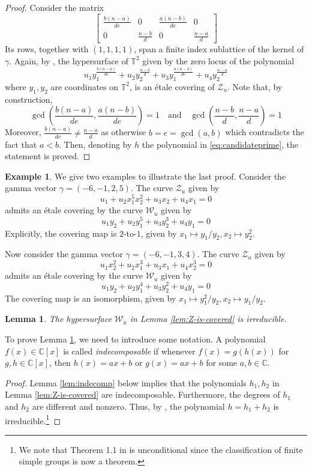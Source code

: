 \documentclass[11pt, reqno]{amsart}
\theoremstyle{plain}
\newtheorem{lem}[thm]{Lemma}
\theoremstyle{definition}
\newtheorem{example}[thm]{Example}
\newcommand{\CC}{\mathbb{C}}
\newcommand{\TT}{\mathbb{T}}
\newcommand{\ga}{\gamma}
\begin{document}
\begin{proof}
Consider the matrix 
\[
\begin{bmatrix}
    \frac{b(n-a)}{de} & 0 &\frac{a(n-b)}{de} &0 \\
    0 & \frac{n-b}{d}& 0 & \frac{n-a}{d}
\end{bmatrix}
\]
Its rows, together with $(1,1,1,1)$, span a finite index sublattice of the kernel of $\gamma$. Again, by \cite[Proposition 3.6]{asem-hgms-toric}, 
the hypersurface of $\TT^2$ given by the zero locus of the polynomial
\begin{equation}
\label{eq:candidateprime}
u_1  y_1^{\frac{b(n-a)}{de}}+ u_2 y_2^{\frac{n-b}{d}}  +u_3 y_1^{\frac{a(n-b)}{de}} +u_4 y_2^{\frac{n-a}{d}}
\end{equation}
where $y_1, y_2$ are coordinates on $\TT^2$,
is an étale covering of $\mathcal{Z}_{u}$. Note that, by construction,  
\[\gcd\left(\frac{b(n-a)}{de}, \frac{a(n-b)}{de}\right)=1 \quad \text{and} \quad  \gcd\left(\frac{n-b}{d}, \frac{n-a}{d}\right)=1\]
Moreover, $\frac{b(n-a)}{de} \neq \frac{n-a}{d}$ as otherwise $b=e=\gcd(a,b)$ which contradicts the fact that $a<b$.
Then, denoting by $h$ the polynomial in \eqref{eq:candidateprime}, the statement is proved. 
\end{proof}

\begin{example}
We give two examples to illustrate the last proof. 
Consider the gamma vector $\ga=(-6,-1,2,5)$. The curve $\mathcal{Z}_u$ given by
\[
u_1 +u_2 x_1^{5}x_2^2 +u_3 x_2 + u_4 x_1=0\]
admits an étale covering by the curve $\mathcal{W}_u$ given by
\[
u_1 y_2+u_2 y_1^5+u_3 y_2^3 +u_4 y_1=0
\]
Explicitly, the covering map is $2$-to-$1$, given by 
    $
    x_1 \mapsto y_1/y_2, x_2 \mapsto y_2^2
    $. 

Now consider the gamma vector $\ga=(-6,-1,3,4)$. The curve $\mathcal{Z}_u$ given by
    \[
    u_1x_2^2 +u_2x_1^{3} +u_3x_1 + u_4x_2^3=0
    \]
admits an étale covering by the curve $\mathcal{W}_u$ given by
    \[
   u_1 y_2 +u_2 y_1^4 +u_3 y_2^2+u_4 y_1=0
    \]
The covering map is an isomorphism, given by
    $
    x_1 \mapsto y_1^2/y_2, x_2 \mapsto y_1/y_2
    $.
\end{example}

\begin{lem}\label{lem:W-is-irreducible}
    The hypersurface $\mathcal{W}_u$ in Lemma \ref{lem:Z-is-covered} is irreducible.
\end{lem}
To prove Lemma \ref{lem:W-is-irreducible}, we need to introduce some notation. 
A polynomial $f(x) \in \CC[x]$ is called \emph{indecomposable} if whenever $f(x) = g(h(x))$ for $g,h\in \CC[x]$, then $h(x)= ax+b$ or $g(x) =ax+b$ for some $a,b \in \CC$.
\begin{proof}
Lemma \ref{lem:indecomp} below implies that the polynomials $h_1,h_2$ in Lemma  \ref{lem:Z-is-covered} are indecomposable. Furthermore, the degrees of $h_1$ and $h_2$ are different and nonzero.
Thus, by \cite[Theorem 1.1]{consequences-of-classific}, the polynomial $h=h_1+h_2$ is irreducible.\footnote{ 
We note that Theorem 1.1 in \cite{consequences-of-classific} is unconditional since the classification of finite simple groups is now a theorem.}
\end{proof}
\end{document}
